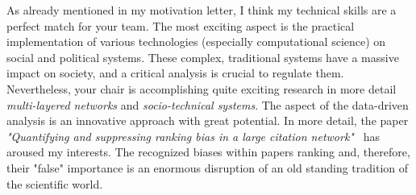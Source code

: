\begin{homeworkProblem}
  As already mentioned in my motivation letter, I think my technical skills are a perfect match for your team. The most exciting aspect is the practical implementation of various technologies (especially computational science) on social and political systems. These complex, traditional systems have a massive impact on society, and a critical analysis is crucial to regulate them.\\

  Nevertheless, your chair is accomplishing quite exciting research in more detail \textit{multi-layered networks} and \textit{socio-technical systems}. The aspect of the data-driven analysis is an innovative approach with great potential. In more detail, the paper \textit{"Quantifying and suppressing ranking bias in a large citation network"}~\cite{Vaccario2017Aug} has aroused my interests. The recognized biases within papers ranking and, therefore, their "false" importance is an enormous disruption of an old standing tradition of the scientific world.\\
\end{homeworkProblem}

